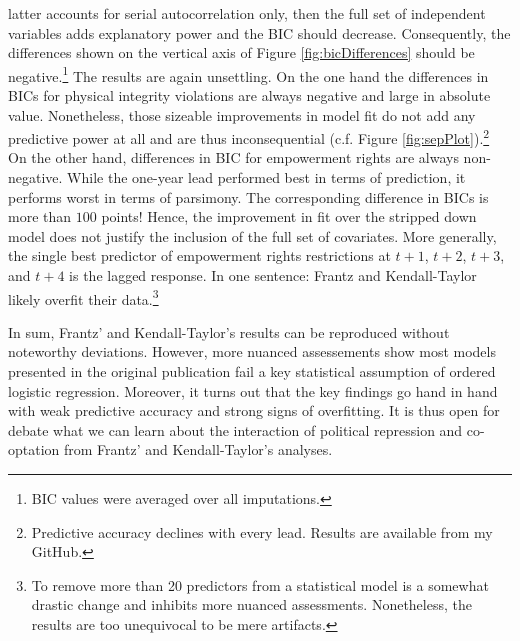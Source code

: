 latter accounts for serial autocorrelation only, then 
the full set of independent variables adds explanatory 
power and the BIC should decrease. Consequently, the 
differences shown on the vertical axis of Figure 
\ref{fig:bicDifferences} should be negative.\footnote{BIC 
values were averaged over all imputations.} The results are 
again unsettling. On the one hand the differences in BICs 
for physical integrity violations are always negative and 
large in absolute value. Nonetheless, those sizeable 
improvements in model fit do not add any predictive power at
all and are thus inconsequential (c.f. Figure 
\ref{fig:sepPlot}).\footnote{Predictive accuracy declines 
with every lead. Results are available from my GitHub.} On 
the other hand, differences in BIC for empowerment rights 
are always non-negative. While the one-year lead performed 
best in terms of prediction, it performs worst in terms of 
parsimony. The corresponding difference in BICs is more than
$100$ points! Hence, the improvement in fit over the 
stripped down model does not justify the inclusion of the 
full set of covariates. More generally, the single best 
predictor of empowerment rights restrictions at $t+1$,
$t+2$, $t+3$, and $t+4$ is the lagged response. In one 
sentence: Frantz and Kendall-Taylor likely overfit their 
data.\footnote{To remove more than 20 predictors from a 
statistical model is a somewhat drastic change  and inhibits 
more nuanced assessments. Nonetheless, the results are too 
unequivocal to be mere artifacts.}

In sum, Frantz' and Kendall-Taylor's results can be 
reproduced without noteworthy deviations. However, more 
nuanced assessements show most models presented 
in the original publication fail a key statistical 
assumption of ordered logistic regression. Moreover, it 
turns out that the key findings go hand in hand with weak 
predictive accuracy and strong signs of overfitting. It is 
thus open for debate what we can learn about the 
interaction of political repression and co-optation from
Frantz' and Kendall-Taylor's analyses.